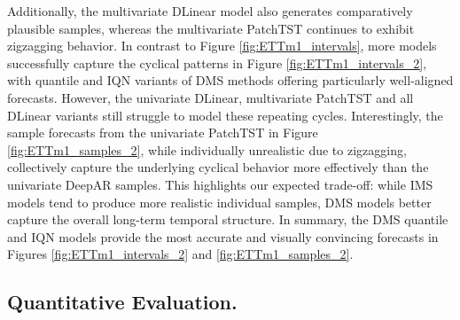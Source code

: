 \documentclass[a4paper,oneside,bibliography=totoc]{scrbook}
\begin{document}
Additionally, the multivariate DLinear model also generates comparatively plausible samples, whereas the multivariate PatchTST continues to exhibit zigzagging behavior.
In contrast to Figure \ref{fig:ETTm1_intervals}, more models successfully capture the cyclical patterns in Figure \ref{fig:ETTm1_intervals_2}, with quantile and IQN variants of DMS methods offering particularly well-aligned forecasts. However, the univariate DLinear, multivariate PatchTST and all DLinear variants still struggle to model these repeating cycles.
Interestingly, the sample forecasts from the univariate PatchTST in Figure \ref{fig:ETTm1_samples_2}, while individually unrealistic due to zigzagging, collectively capture the underlying cyclical behavior more effectively than the univariate DeepAR samples.
This highlights our expected trade-off: while IMS models tend to produce more realistic individual samples, DMS models better capture the overall long-term temporal structure.
In summary, the DMS quantile and IQN models provide the most accurate and visually convincing forecasts in Figures \ref{fig:ETTm1_intervals_2} and \ref{fig:ETTm1_samples_2}.




\subsection{Quantitative Evaluation.}
\end{document}
